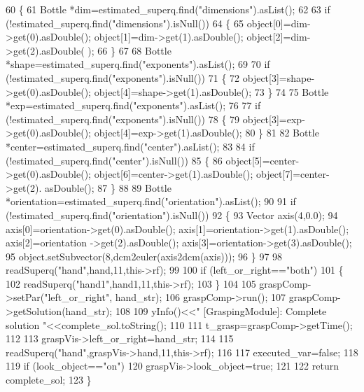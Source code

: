 \begin{DoxyCode}
60 \{
61     Bottle *dim=estimated\_superq.find(\textcolor{stringliteral}{"dimensions"}).asList();
62 
63     \textcolor{keywordflow}{if} (!estimated\_superq.find(\textcolor{stringliteral}{"dimensions"}).isNull())
64     \{
65         \textcolor{keywordtype}{object}[0]=dim->get(0).asDouble(); \textcolor{keywordtype}{object}[1]=dim->get(1).asDouble(); \textcolor{keywordtype}{object}[2]=dim->get(2).asDouble(
      );
66     \}
67 
68     Bottle *shape=estimated\_superq.find(\textcolor{stringliteral}{"exponents"}).asList();
69 
70     \textcolor{keywordflow}{if} (!estimated\_superq.find(\textcolor{stringliteral}{"exponents"}).isNull())
71     \{
72         \textcolor{keywordtype}{object}[3]=shape->get(0).asDouble(); \textcolor{keywordtype}{object}[4]=shape->get(1).asDouble();
73     \}
74 
75     Bottle *exp=estimated\_superq.find(\textcolor{stringliteral}{"exponents"}).asList();
76 
77     \textcolor{keywordflow}{if} (!estimated\_superq.find(\textcolor{stringliteral}{"exponents"}).isNull())
78     \{
79         \textcolor{keywordtype}{object}[3]=exp->get(0).asDouble(); \textcolor{keywordtype}{object}[4]=exp->get(1).asDouble();
80     \}
81 
82     Bottle *center=estimated\_superq.find(\textcolor{stringliteral}{"center"}).asList();
83 
84     \textcolor{keywordflow}{if} (!estimated\_superq.find(\textcolor{stringliteral}{"center"}).isNull())
85     \{
86         \textcolor{keywordtype}{object}[5]=center->get(0).asDouble(); \textcolor{keywordtype}{object}[6]=center->get(1).asDouble(); \textcolor{keywordtype}{object}[7]=center->get(2).
      asDouble();
87     \}
88 
89     Bottle *orientation=estimated\_superq.find(\textcolor{stringliteral}{"orientation"}).asList();
90 
91     \textcolor{keywordflow}{if} (!estimated\_superq.find(\textcolor{stringliteral}{"orientation"}).isNull())
92     \{
93         Vector axis(4,0.0);
94         axis[0]=orientation->get(0).asDouble(); axis[1]=orientation->get(1).asDouble(); axis[2]=orientation
      ->get(2).asDouble(); axis[3]=orientation->get(3).asDouble();
95         \textcolor{keywordtype}{object}.setSubvector(8,dcm2euler(axis2dcm(axis)));
96     \}
97 
98     readSuperq(\textcolor{stringliteral}{"hand"},hand,11,this->rf);
99 
100     \textcolor{keywordflow}{if} (left_or_right==\textcolor{stringliteral}{"both"})
101     \{
102         readSuperq(\textcolor{stringliteral}{"hand1"},hand1,11,this->rf);
103     \}
104 
105     graspComp->setPar(\textcolor{stringliteral}{"left\_or\_right"}, hand\_str);
106     graspComp->run();
107     graspComp->getSolution(hand\_str);
108 
109     yInfo()<<\textcolor{stringliteral}{" [GraspingModule]: Complete solution "}<<complete_sol.toString();
110 
111     t\_grasp=graspComp->getTime();
112 
113     graspVis->left_or_right=hand\_str;
114 
115     readSuperq(\textcolor{stringliteral}{"hand"},graspVis->hand,11,this->rf);
116 
117     executed_var=\textcolor{keyword}{false};
118 
119     \textcolor{keywordflow}{if} (look_object==\textcolor{stringliteral}{"on"})
120         graspVis->look_object=\textcolor{keyword}{true};
121 
122     \textcolor{keywordflow}{return} complete_sol;
123 \}
\end{DoxyCode}
